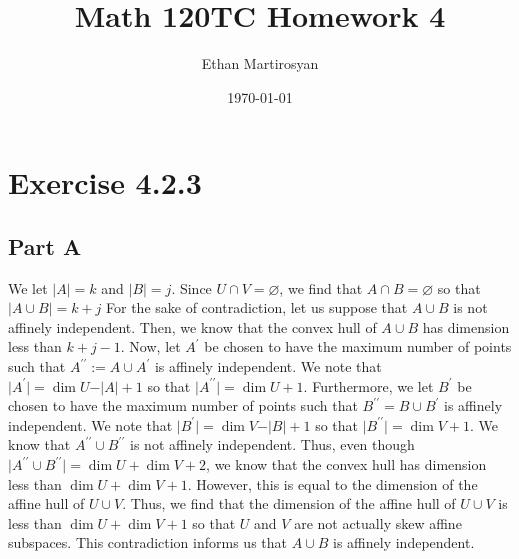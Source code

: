 \documentclass[12pt]{article}
\begin{document}
 
\title{Math 120TC Homework 4}
\author{Ethan Martirosyan}
\date{\today}
\maketitle
{}
\hfuzz=50pt
\section*{Exercise 4.2.3}
\subsection*{Part A}
We let $\vert A \vert = k$ and $\vert B \vert = j$. Since $U \cap V = \varnothing$, we find that $A \cap B = \varnothing$ so that $\vert A \cup B \vert = k + j$ For the sake of contradiction, let us suppose that $A \cup B$ is not affinely independent. Then, we know that the convex hull of $A \cup B$ has dimension less than $k + j - 1$. Now, let $A^\prime$ be chosen to have the maximum number of points such that $A^{\prime\prime} := A \cup A^\prime$ is affinely independent. We note that $\vert A^\prime \vert = \dim U - \vert A \vert + 1$ so that $\vert A^{\prime\prime} \vert = \dim U + 1$.  Furthermore, we let $B^\prime$ be chosen to have the maximum number of points such that $B^{\prime\prime} = B \cup B^\prime$ is affinely independent. We note that $\vert B^\prime \vert = \dim V - \vert B \vert + 1$ so that $\vert B^{\prime\prime} \vert = \dim V  + 1$. We know that $A^{\prime\prime} \cup B^{\prime\prime}$ is not affinely independent. Thus, even though $\vert A^{\prime\prime} \cup B^{\prime\prime}\vert = \dim U + \dim V + 2$, we know that the convex hull has dimension less than $\dim U + \dim V + 1$. However, this is equal to the dimension of the affine hull of $U \cup V$. Thus, we find that the dimension of the affine hull of $U\cup V$ is less than $\dim U + \dim V + 1$ so that $U$ and $V$ are not actually skew affine subspaces. This contradiction informs us that $A \cup B$ is affinely independent. 
\newpage
\end{document}
